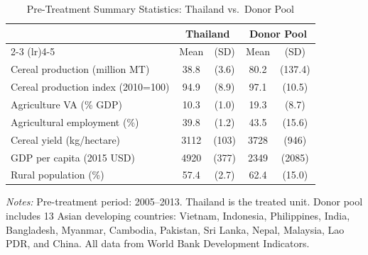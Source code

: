 \begin{table}[htbp]
\centering
\begin{threeparttable}
\caption{Pre-Treatment Summary Statistics: Thailand vs.\ Donor Pool}
\label{tab:summary}
\begin{tabular}{lcccc}
\toprule
 & \multicolumn{2}{c}{Thailand} & \multicolumn{2}{c}{Donor Pool} \\
 \cmidrule(lr){2-3} \cmidrule(lr){4-5}
 & Mean & (SD) & Mean & (SD) \\
\midrule
  Cereal production (million MT) & 38.8 & (3.6) & 80.2 & (137.4) \\
  Cereal production index (2010=100) & 94.9 & (8.9) & 97.1 & (10.5) \\
  Agriculture VA (\% GDP) & 10.3 & (1.0) & 19.3 & (8.7) \\
  Agricultural employment (\%) & 39.8 & (1.2) & 43.5 & (15.6) \\
  Cereal yield (kg/hectare) & 3112 & (103) & 3728 & (946) \\
  GDP per capita (2015 USD) & 4920 & (377) & 2349 & (2085) \\
  Rural population (\%) & 57.4 & (2.7) & 62.4 & (15.0) \\
\bottomrule
\end{tabular}
\begin{tablenotes}[flushleft]\footnotesize
\item \textit{Notes:} Pre-treatment period: 2005--2013. Thailand is the treated unit. Donor pool includes 13 Asian developing countries: Vietnam, Indonesia, Philippines, India, Bangladesh, Myanmar, Cambodia, Pakistan, Sri Lanka, Nepal, Malaysia, Lao PDR, and China. All data from World Bank Development Indicators.
\end{tablenotes}
\end{threeparttable}
\end{table}
